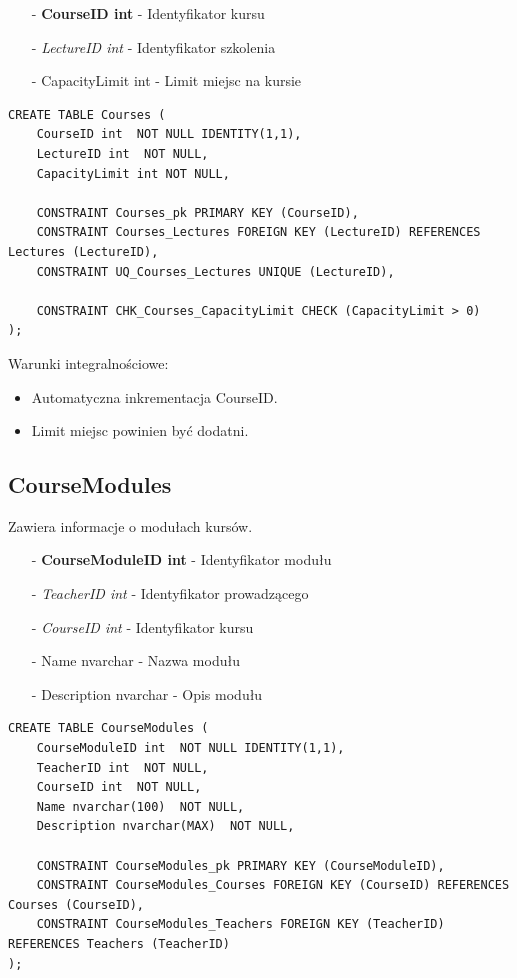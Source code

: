 \documentclass[11pt,a4paper]{article}
\begin{document}
\begin{itemize}
    \item[-] \textbf{CourseID int} - Identyfikator kursu
    \item[-] \textit{LectureID int} - Identyfikator szkolenia
    \item[-] CapacityLimit int - Limit miejsc na kursie
\end{itemize}

\begin{Verbatim}[breaklines=true]
CREATE TABLE Courses (
    CourseID int  NOT NULL IDENTITY(1,1),
    LectureID int  NOT NULL,
    CapacityLimit int NOT NULL,

    CONSTRAINT Courses_pk PRIMARY KEY (CourseID),
    CONSTRAINT Courses_Lectures FOREIGN KEY (LectureID) REFERENCES Lectures (LectureID),
    CONSTRAINT UQ_Courses_Lectures UNIQUE (LectureID),

    CONSTRAINT CHK_Courses_CapacityLimit CHECK (CapacityLimit > 0)
);
\end{Verbatim}

Warunki integralnościowe:
\begin{itemize}
    \item Automatyczna inkrementacja CourseID.
    \item Limit miejsc powinien być dodatni.
\end{itemize}

\subsection{CourseModules}
Zawiera informacje o modułach kursów.

\begin{itemize}
    \item[-] \textbf{CourseModuleID int} - Identyfikator modułu
    \item[-] \textit{TeacherID int} - Identyfikator prowadzącego
    \item[-] \textit{CourseID int} - Identyfikator kursu
    \item[-] Name nvarchar - Nazwa modułu 
    \item[-] Description nvarchar - Opis modułu 
\end{itemize}

\begin{Verbatim}[breaklines=true]
CREATE TABLE CourseModules (
    CourseModuleID int  NOT NULL IDENTITY(1,1),
    TeacherID int  NOT NULL,
    CourseID int  NOT NULL,
    Name nvarchar(100)  NOT NULL,
    Description nvarchar(MAX)  NOT NULL,

    CONSTRAINT CourseModules_pk PRIMARY KEY (CourseModuleID),
    CONSTRAINT CourseModules_Courses FOREIGN KEY (CourseID) REFERENCES Courses (CourseID),
    CONSTRAINT CourseModules_Teachers FOREIGN KEY (TeacherID) REFERENCES Teachers (TeacherID)
);
\end{Verbatim}
\end{document}

